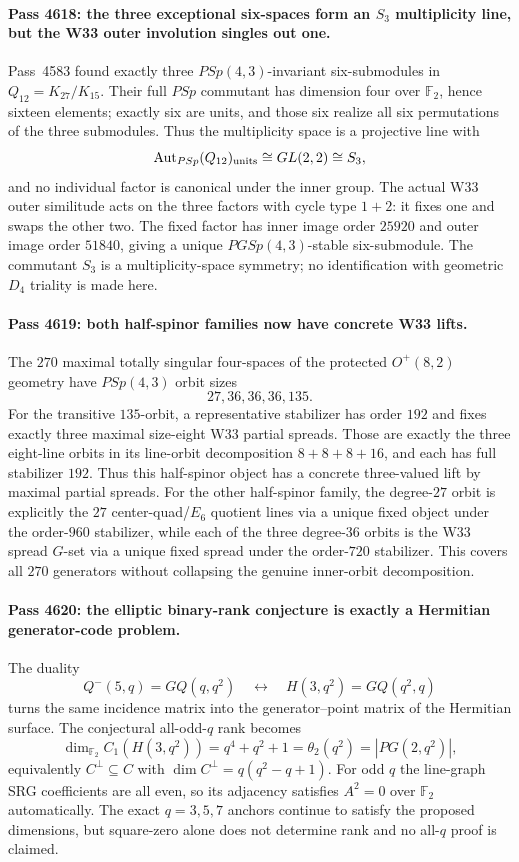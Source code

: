 \paragraph{Pass 4618: the three exceptional six-spaces form an $S_3$ multiplicity line, but the W33 outer involution singles out one.}
Pass~4583 found exactly three $PSp(4,3)$-invariant six-submodules in
$Q_{12}=K_{27}/K_{15}$.  Their full $PSp$ commutant has dimension four over
$\mathbb F_2$, hence sixteen elements; exactly six are units, and those six
realize all six permutations of the three submodules.  Thus the multiplicity
space is a projective line with
\[
 \operatorname{Aut}_{PSp}(Q_{12})_{\rm units}\cong GL(2,2)\cong S_3,
\]
and no individual factor is canonical under the inner group.  The actual W33
outer similitude acts on the three factors with cycle type $1+2$: it fixes one
and swaps the other two.  The fixed factor has inner image order $25920$ and
outer image order $51840$, giving a unique $PGSp(4,3)$-stable six-submodule.
The commutant $S_3$ is a multiplicity-space symmetry; no identification with
geometric $D_4$ triality is made here.

\paragraph{Pass 4619: both half-spinor families now have concrete W33 lifts.}
The $270$ maximal totally singular four-spaces of the protected $O^+(8,2)$
geometry have $PSp(4,3)$ orbit sizes
\[
 \boxed{27,36,36,36,135}.
\]
For the transitive $135$-orbit, a representative stabilizer has order $192$ and
fixes exactly three maximal size-eight W33 partial spreads.  Those are exactly
the three eight-line orbits in its line-orbit decomposition
$8+8+8+16$, and each has full stabilizer $192$.  Thus this half-spinor object
has a concrete three-valued lift by maximal partial spreads.  For the other
half-spinor family, the degree-$27$ orbit is explicitly the $27$ center-quad/$E_6$
quotient lines via a unique fixed object under the order-$960$ stabilizer, while
each of the three degree-$36$ orbits is the W33 spread $G$-set via a unique
fixed spread under the order-$720$ stabilizer.  This covers all $270$ generators
without collapsing the genuine inner-orbit decomposition.

\paragraph{Pass 4620: the elliptic binary-rank conjecture is exactly a Hermitian generator-code problem.}
The duality
\[
 Q^-(5,q)=GQ(q,q^2)\quad\longleftrightarrow\quad
 H(3,q^2)=GQ(q^2,q)
\]
turns the same incidence matrix into the generator--point matrix of the
Hermitian surface.  The conjectural all-odd-$q$ rank becomes
\[
 \boxed{\dim_{\mathbb F_2}C_1(H(3,q^2))
       =q^4+q^2+1=\theta_2(q^2)=|PG(2,q^2)|},
\]
equivalently $C^\perp\subseteq C$ with
$\dim C^\perp=q(q^2-q+1)$.  For odd $q$ the line-graph SRG coefficients are all
even, so its adjacency satisfies $A^2=0$ over $\mathbb F_2$ automatically.
The exact $q=3,5,7$ anchors continue to satisfy the proposed dimensions, but
square-zero alone does not determine rank and no all-$q$ proof is claimed.

